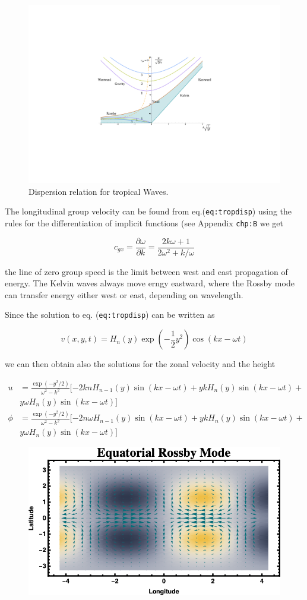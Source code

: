 \begin{figure}
\centering
\includegraphics[width = .7 \textwidth]{figs/GD/TropDisp.png}
\caption{Dispersion relation for tropical Waves.}
\end{figure}

The longitudinal group velocity can be found from
eq.(\texttt{eq:tropdisp}) using the rules for the differentiation of
implicit functions (see Appendix \texttt{chp:B} we get

\[c_{gx} = \frac{\partial \omega}{\partial k} = \frac{2 k \omega +1}{2\omega^2 + k/\omega}\]

the line of zero group speed is the limit between west and east
propagation of energy. The Kelvin waves always move erngy eastward,
where the Rossby mode can transfer energy either west or east, depending
on wavelength.

Since the solution to eq. (\texttt{eq:tropdisp}) can be written as

\[v(x,y,t) = H_n(y)\exp{(-\frac{1}{2}y^2)} \cos( k x - \omega t)\]

we can then obtain also the solutions for the zonal velocity and the
height

\[\begin{aligned}
u &= \frac{\exp(-y^2/2)}{\omega^2 -k^2}[ -2 k n H_{n-1}(y) \sin( k x - \omega t) + y k H_n(y) \sin( k x - \omega t) + \\
&y \omega H_{n}(y) \sin( k x - \omega t) ] \\
\phi &= \frac{\exp(-y^2/2)}{\omega^2 -k^2} [-2 n \omega H_{n-1}(y) \sin( k x - \omega t) + y k H_n(y) \sin( k x - \omega t) + \\
&y \omega H_{n}(y) \sin( k x - \omega t)]
\end{aligned}\]

\begin{figure}
\centering
\includegraphics[width = .7 \textwidth]{figs/GD/RossbyWave.png}
\caption{}
\end{figure}


